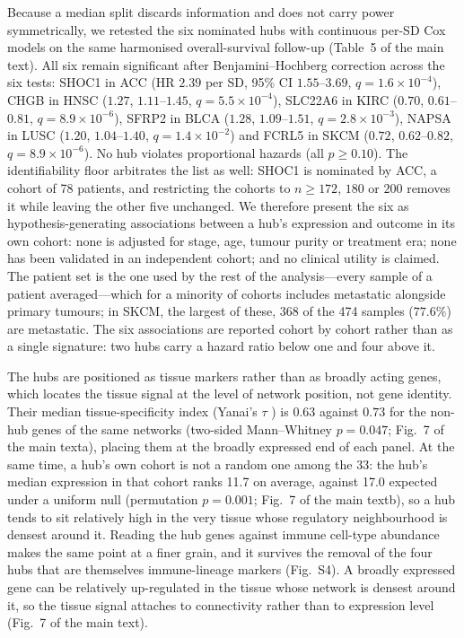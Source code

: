 \documentclass[11pt]{article}
\begin{document}
Because a median split discards information and does not carry power symmetrically, we retested the six nominated hubs with continuous per-SD Cox models on the same harmonised overall-survival follow-up (Table~5 of the main text). All six remain significant after Benjamini--Hochberg correction across the six tests: SHOC1 in ACC (HR $2.39$ per SD, 95\% CI $1.55$--$3.69$, $q = 1.6 \times 10^{-4}$), CHGB in HNSC ($1.27$, $1.11$--$1.45$, $q = 5.5 \times 10^{-4}$), SLC22A6 in KIRC ($0.70$, $0.61$--$0.81$, $q = 8.9 \times 10^{-6}$), SFRP2 in BLCA ($1.28$, $1.09$--$1.51$, $q = 2.8 \times 10^{-3}$), NAPSA in LUSC ($1.20$, $1.04$--$1.40$, $q = 1.4 \times 10^{-2}$) and FCRL5 in SKCM ($0.72$, $0.62$--$0.82$, $q = 8.9 \times 10^{-6}$). No hub violates proportional hazards (all $p \ge 0.10$). The identifiability floor arbitrates the list as well: SHOC1 is nominated by ACC, a cohort of 78 patients, and restricting the cohorts to $n \ge 172$, $180$ or $200$ removes it while leaving the other five unchanged. We therefore present the six as hypothesis-generating associations between a hub's expression and outcome in its own cohort: none is adjusted for stage, age, tumour purity or treatment era; none has been validated in an independent cohort; and no clinical utility is claimed. The patient set is the one used by the rest of the analysis---every sample of a patient averaged---which for a minority of cohorts includes metastatic alongside primary tumours; in SKCM, the largest of these, 368 of the 474 samples ($77.6\%$) are metastatic. The six associations are reported cohort by cohort rather than as a single signature: two hubs carry a hazard ratio below one and four above it.

The hubs are positioned as tissue markers rather than as broadly acting genes, which locates the tissue signal at the level of network position, not gene identity. Their median tissue-specificity index (Yanai's $\tau$ \citep{yanai2005genome}) is $0.63$ against $0.73$ for the non-hub genes of the same networks (two-sided Mann--Whitney $p = 0.047$; Fig.~7 of the main texta), placing them at the broadly expressed end of each panel. At the same time, a hub's own
cohort is not a random one among the 33: the hub's median expression in that cohort ranks 11.7 on
average, against 17.0 expected under a uniform null (permutation $p = 0.001$;
Fig.~7 of the main textb), so a hub tends to sit relatively high in the very tissue whose regulatory
neighbourhood is densest around it. Reading the hub genes against immune cell-type abundance
\citep{ru2019tisidb,xu2025tam} makes the same point at a finer grain, and it survives the removal of the four hubs that are
themselves immune-lineage markers (Fig.~S4). A broadly expressed gene can be relatively
up-regulated in the tissue whose network is densest around it, so the tissue signal attaches to
connectivity rather than to expression level (Fig.~7 of the main text).
\end{document}
